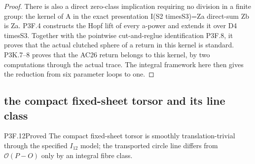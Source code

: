 \begin{proof}
There is also a direct zero-class implication requiring no division in a finite group: the kernel of A in the exact presentation I(S2 timesS3)=Za direct-sum Zb is Za. P3F.4 constructs the Hopf lift of every a-power and extends it over D4 timesS3. Together with the pointwise cut-and-reglue identification P3F.8, it proves that the actual clutched sphere of a return in this kernel is standard. P3K.7--8 proves that the AC26 return belongs to this kernel, by two computations through the actual trace. The integral framework here then gives the reduction from six parameter loops to one.
\end{proof}
\subsection{the compact fixed-sheet torsor and its line class}
\begin{statement}{P3F.12}{Proved}
The compact fixed-sheet torsor is smoothly translation-trivial through the specified $I_{12}$ model; the transported circle line differs from $\mathcal O(P-O)$ only by an integral fibre class.
\end{statement}
